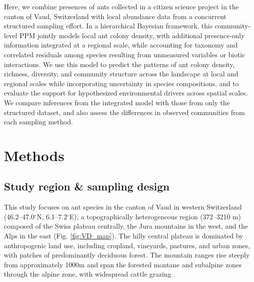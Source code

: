 \documentclass[preprint,final,times,12pt,3p]{elsarticle}
\begin{document}
Here, we combine presences of ants collected in a citizen science project in the canton of Vaud, Switzerland with local abundance data from a concurrent structured sampling effort. In a hierarchical Bayesian framework, this community-level PPM jointly models local ant colony density, with additional presence-only information integrated at a regional scale, while accounting for taxonomy and correlated residuals among species resulting from unmeasured variables or biotic interactions. We use this model to predict the patterns of ant colony density, richness, diversity, and community structure across the landscape at local and regional scales while incorporating uncertainty in species compositions, and to evaluate the support for hypothesized environmental drivers across spatial scales. We compare inferences from the integrated model with those from only the structured dataset, and also assess the differences in observed communities from each sampling method.





\section{Methods}
\label{S:2}
\subsection{Study region \& sampling design}
This study focuses on ant species in the canton of Vaud in western Switzerland (46.2–47.0$^{\circ}$N, 6.1–7.2$^{\circ}$E), a topographically heterogeneous region (372–3210 m) composed of the Swiss plateau centrally, the Jura mountains in the west, and the Alps in the east (Fig. \ref{fig:VD_map}). The hilly central plateau is dominated by anthropogenic land use, including cropland, vineyards, pastures, and urban zones, with patches of predominantly deciduous forest. The mountain ranges rise steeply from approximately 1000m and span the forested montane and subalpine zones through the alpine zone, with widespread cattle grazing \citep{Delarze2015,Gago-Silva2017,Beck2017}. 
\end{document}

